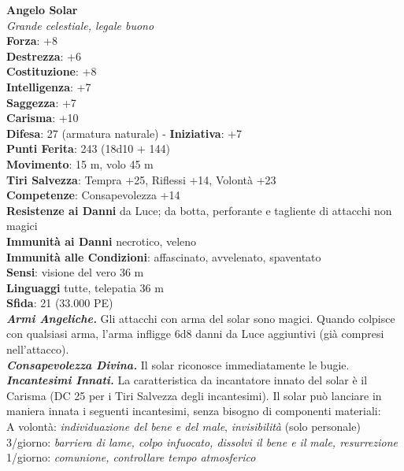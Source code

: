 \begin{multicols}{2}
\medskip\textbf{Angelo Solar}\\
\emph{Grande celestiale, legale buono}\\
\textbf{Forza}: +8\\
\textbf{Destrezza}: +6\\
\textbf{Costituzione}: +8\\
\textbf{Intelligenza}: +7\\
\textbf{Saggezza}: +7\\
\textbf{Carisma}: +10\\
\textbf{Difesa}: 27 (armatura naturale) - \textbf{Iniziativa}: +7\\
\textbf{Punti Ferita}: 243 (18d10 + 144)\\
\textbf{Movimento}: 15 m, volo 45 m\\
\textbf{Tiri Salvezza}: Tempra +25, Riflessi +14, Volontà +23\\
\textbf{Competenze}: Consapevolezza +14\\
\textbf{Resistenze ai Danni} da Luce; da botta, perforante e tagliente di attacchi non magici\\
\textbf{Immunità ai Danni} necrotico, veleno\\
\textbf{Immunità alle Condizioni}: affascinato, avvelenato, spaventato\\
\textbf{Sensi}: visione del vero 36 m\\
\textbf{Linguaggi} tutte, telepatia 36 m\\
\textbf{Sfida}: 21 (33.000 PE)\smallskip\\
\emph{\textbf{Armi Angeliche.}} Gli attacchi con arma del solar sono magici. Quando colpisce con qualsiasi arma, l'arma infligge 6d8 danni da Luce aggiuntivi (già compresi nell'attacco).\\
\emph{\textbf{Consapevolezza Divina.}} Il solar riconosce immediatamente le bugie.\\
\emph{\textbf{Incantesimi Innati.}} La caratteristica da incantatore innato del solar è il Carisma (DC 25 per i Tiri Salvezza degli incantesimi). Il solar può lanciare in maniera innata i seguenti incantesimi, senza bisogno di componenti materiali:\\
A volontà: \emph{individuazione del bene e del male}, \emph{invisibilità} (solo personale)\\
3/giorno: \emph{barriera di lame, colpo infuocato, dissolvi il bene e il} \emph{male, resurrezione}\\
1/giorno: \emph{comunione, controllare tempo atmosferico}\\

\end{multicols}
